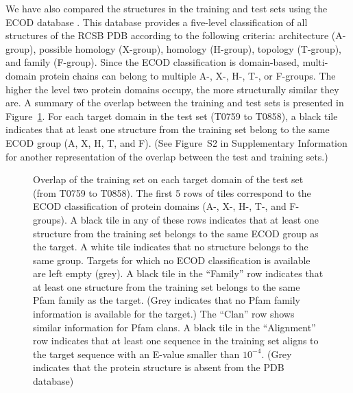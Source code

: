\documentclass{bioinfo}
\begin{document}
We have also compared the structures in the training and test sets
using the ECOD database \citep{cheng2014ecod}. This database provides a
five-level classification of all structures of the RCSB PDB
\citep{berman2000protein} according to the following criteria:
architecture (A-group), possible homology (X-group), homology
(H-group), topology (T-group), and family (F-group).  Since the ECOD
classification is domain-based, multi-domain protein chains can belong
to multiple A-, X-, H-, T-, or F-groups.  The higher the level two
protein domains occupy, the more structurally similar they are.
%
A summary of the overlap between the training and test sets is
presented in Figure~\ref{Fig:summaryTable}. For each target domain in
the test set (T0759 to T0858), a black tile indicates that at least
one structure from the training set belong to the same ECOD group (A,
X, H, T, and F). (See Figure~S2 in Supplementary Information for another
representation of the overlap between the test and training sets.)

\begin{figure}[!tpb]
%
    \caption{Overlap of the training set on each target domain of the
    test set (from T0759 to T0858). The first 5 rows of tiles
    correspond to the ECOD classification of protein domains (A-, X-,
    H-, T-, and F-groups). A black tile in any of these rows indicates
    that at least one structure from the training set belongs to the
    same ECOD group as the target. A white tile indicates that no
    structure belongs to the same group. Targets for which no ECOD
    classification is available are left empty (grey).
    A black tile in the ``Family'' row indicates that at least one
    structure from the training set belongs to the same Pfam family as
    the target. (Grey indicates that no Pfam family information is
    available for the target.) The ``Clan'' row shows similar
    information for Pfam clans. A black tile in the ``Alignment'' row
    indicates that at least one sequence in the training set aligns to
    the target sequence with an E-value smaller than $10^{-4}$. (Grey
    indicates that the protein structure is absent from the PDB database)}
    \label{Fig:summaryTable}
\end{figure}
\end{document}
